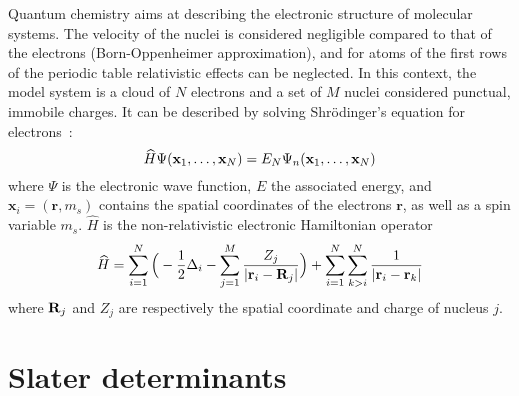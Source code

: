 \documentclass[./thesis.tex]{subfiles}
\begin{document}
Quantum chemistry aims at describing the electronic structure of molecular
systems.  The velocity of the nuclei is considered negligible compared to that
of the electrons (Born-Oppenheimer approximation), and for atoms of the first
rows of the periodic table relativistic effects can be neglected.  In this
context, the model system is a cloud of $N$ electrons and a set of $M$ nuclei
considered punctual, immobile charges. It can be described by solving
Shrödinger's equation for electrons~:
\begin{equation}
 \widehat{H} \Psi({\bf x}_1,\dots,{\bf x}_N) = E_N \Psi_n({\bf x}_1,\dots,{\bf x}_N)
\end{equation}
where $\Psi$ is the electronic wave function, $E$ the associated energy, and $\mathbf{x}_i = (\textbf{r},m_s)$
contains the spatial coordinates of the electrons $\textbf{r}$, as well as a spin variable $m_s$.
$\widehat H$ is the non-relativistic electronic Hamiltonian operator
\begin{equation}
\widehat{H} = \sum_{i=1}^{N} \Big ( -\frac{1}{2} \Delta_i - \sum_{j=1}^M \frac{Z_j}{|{\bf r}_i - {\bf R}_j|} \Big ) + \sum_{i=1}^{N} \sum_{k>i}^{N} \frac{1}{|{\bf r}_i - {\bf r}_k|}
\end{equation}
where ${\bf R}_j$ and $Z_j$ are respectively the spatial coordinate and charge of nucleus $j$.

\section{Slater determinants}
\end{document}
